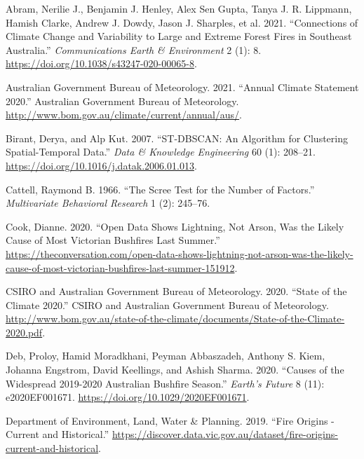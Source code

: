 \hypertarget{refs}{}
\begin{CSLReferences}{1}{0}
\leavevmode{}%
Abram, Nerilie J., Benjamin J. Henley, Alex Sen Gupta, Tanya J. R. Lippmann, Hamish Clarke, Andrew J. Dowdy, Jason J. Sharples, et al. 2021. {``{Connections of Climate Change and Variability to Large and Extreme Forest Fires in Southeast Australia}.''} \emph{{Communications Earth \& Environment}} 2 (1): 8. \url{https://doi.org/10.1038/s43247-020-00065-8}.

\leavevmode{}%
Australian Government Bureau of Meteorology. 2021. {``{Annual Climate Statement 2020}.''} {Australian Government Bureau of Meteorology}. \url{http://www.bom.gov.au/climate/current/annual/aus/}.

\leavevmode{}%
Birant, Derya, and Alp Kut. 2007. {``{ST-DBSCAN: An Algorithm for Clustering Spatial-Temporal Data}.''} \emph{{Data \& Knowledge Engineering}} 60 (1): 208--21. \url{https://doi.org/10.1016/j.datak.2006.01.013}.

\leavevmode{}%
Cattell, Raymond B. 1966. {``{The Scree Test for the Number of Factors}.''} \emph{{Multivariate Behavioral Research}} 1 (2): 245--76.

\leavevmode{}%
Cook, Dianne. 2020. {``{Open Data Shows Lightning, Not Arson, Was the Likely Cause of Most Victorian Bushfires Last Summer}.''} \url{https://theconversation.com/open-data-shows-lightning-not-arson-was-the-likely-cause-of-most-victorian-bushfires-last-summer-151912}.

\leavevmode{}%
CSIRO and Australian Government Bureau of Meteorology. 2020. {``{State of the Climate 2020}.''} {CSIRO and Australian Government Bureau of Meteorology}. \url{http://www.bom.gov.au/state-of-the-climate/documents/State-of-the-Climate-2020.pdf}.

\leavevmode{}%
Deb, Proloy, Hamid Moradkhani, Peyman Abbaszadeh, Anthony S. Kiem, Johanna Engstrom, David Keellings, and Ashish Sharma. 2020. {``{Causes of the Widespread 2019-2020 Australian Bushfire Season}.''} \emph{{Earth's Future}} 8 (11): e2020EF001671. \url{https://doi.org/10.1029/2020EF001671}.

\leavevmode{}%
Department of Environment, Land, Water \& Planning. 2019. {``{Fire Origins - Current and Historical}.''} \url{https://discover.data.vic.gov.au/dataset/fire-origins-current-and-historical}.


\end{CSLReferences}
